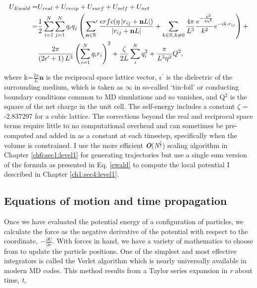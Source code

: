 \begin{theory}
  \begin{equation}\label{ewald}
   \begin{split}
      U_{Ewald} = &U_{real} + U_{recip} + U_{surf} + U_{self} + U_{net} \\
                = &\frac{1}{2} \sum_{i=1}^{N} \sum_{j=1}^{N} q_{i}q_{j} \left(\sideset{}{'}\sum_{\textbf{n} \in 
                \mathbb{R}} \frac{erfc(\eta\left|r_{ij} + \textbf{n}L\right|)}{\left|r_{ij} + \textbf{n}L\right|} + 
                \sum_{k \in \mathbb{K}, k \neq 0} \frac{4\pi}{L^3}\frac{e^{-\frac{k^2}{4\eta^2}}}{k^2}e^{-ik 
                \cdot r_{ij}}\right) + \\
                  & \frac{2\pi}{\left(2\epsilon^{\prime} + 1\right)L^3} \left(\sum_{i=1}^{N} q_{i}r_{i}\right)^2 + 
                  \frac{\zeta}{2L} \sum_{i}^{N} q_{i}^2 + \frac{\pi}{L^3\eta^2}Q^2,
   \end{split}
  \end{equation}
  
  \noindent where k=$\frac{2\pi}{L}\textbf{n}$ is the reciprocal space lattice vector, $\epsilon^{\prime}$ is the 
  dielectric of the surrounding medium, which is taken as $\infty$ in so-called `tin-foil' or conducting boundary
  conditions common to MD simulations and so vanishes, and Q$^{2}$ is the square of the net charge in the unit cell.
  The self-energy includes a constant $\zeta$ = -2.837297 for a cubic lattice. The corrections beyond the real and
  reciprocal space terms require little to no computational overhead and can sometimes be pre-computed and added in
  as a constant at each timestep, specifically when the volume is constrained. I use the more efficient 
  \textbf{\emph{O}}(\emph{N}$^{\frac{3}{2}}$) scaling algorithm in Chapter \ref{ch6:sec1:level1} for generating 
  trajectories but use a single sum version of the formula as presented in Eq. \ref{ewald} to compute the local 
  potential I described in Chapter \ref{ch1:sec4:level1}.
  
  \subsection{\label{ch2:sec3:level5}Equations of motion and time propagation}
  Once we have evaluated the potential energy of a configuration of particles, we calculate the force as the negative
  derivative of the potential with respect to the coordinate, $-\frac{\partial U}{\partial r}$. With forces in hand,
  we have a variety of mathematics to choose from to update the particle positions. One of the simplest and most 
  effective integrators is called the Verlet algorithm which is nearly universally available in modern MD codes.
  This method results from a Taylor series expansion in \emph{r} about time, \emph{t},
  

\end{theory}
